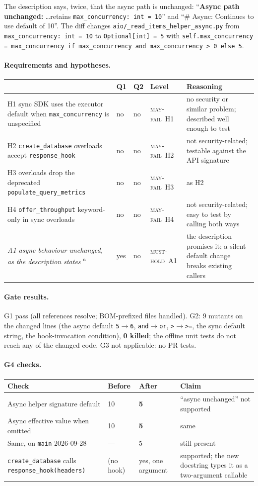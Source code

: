 \documentclass[11pt,a4paper]{article}
\newcommand{\code}[1]{\texttt{#1}}
\newcommand{\musthold}{\textsc{must-hold}}
\newcommand{\mayfail}{\textsc{may-fail}}
\newcommand{\sub}[1]{\paragraph{#1}}
\begin{document}
The description says, twice, that the async path is unchanged: ``\textbf{Async path unchanged:} \ldots retains \code{max\_concurrency: int = 10}'' and ``\# Async: Continues to use default of 10''. The diff changes \code{aio/\_read\_items\_helper\_async.py} from \code{max\_concurrency: int = 10} to \code{Optional[int] = 5} with \code{self.max\_concurrency = max\_concurrency if max\_concurrency and max\_concurrency > 0 else 5}.

\sub{Requirements and hypotheses.}
\begin{center}\small\begin{tabularx}{\textwidth}{p{} l l l X}
\toprule & Q1 & Q2 & Level & Reasoning \\ \midrule
H1 sync SDK uses the executor default when \code{max\_concurrency} is unspecified & no & no & \mayfail\ H1 & no security or similar problem; described well enough to test \\
H2 \code{create\_database} overloads accept \code{response\_hook} & no & no & \mayfail\ H2 & not security-related; testable against the API signature \\
H3 overloads drop the deprecated \code{populate\_query\_metrics} & no & no & \mayfail\ H3 & as H2 \\
H4 \code{offer\_throughput} keyword-only in sync overloads & no & no & \mayfail\ H4 & not security-related; easy to test by calling both ways \\
\emph{A1 async behaviour unchanged, as the description states} \textsuperscript{a} & yes & no & \musthold\ A1 & the description promises it; a silent default change breaks existing callers \\
\bottomrule\end{tabularx}\end{center}

\sub{Gate results.} G1 pass (all references resolve; BOM-prefixed files handled). G2: 9 mutants on the changed lines (the async default \code{5$\to$6}, \code{and$\to$or}, \code{>$\to$>=}, the sync default string, the hook-invocation condition), \textbf{0 killed}; the offline unit tests do not reach any of the changed code. G3 not applicable: no PR tests.

\sub{G4 checks.}
\begin{center}\small\begin{tabularx}{\textwidth}{X l l X}
\toprule Check & Before & After & Claim \\ \midrule
Async helper signature default & 10 & \textbf{5} & ``async unchanged'' not supported \\
Async effective value when omitted & 10 & \textbf{5} & same \\
Same, on \code{main} 2026-09-28 & --- & 5 & still present \\
\code{create\_database} calls \code{response\_hook(headers)} & (no hook) & yes, one argument & supported; the new docstring types it as a two-argument callable \\
\bottomrule\end{tabularx}\end{center}
\end{document}
